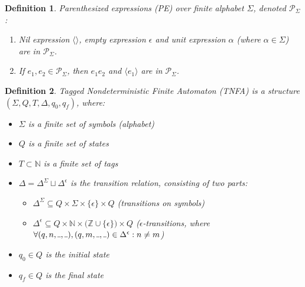 \documentclass[AMA,STIX1COL]{WileyNJD-v2}
\newcommand{\Xl}{\langle}
\newcommand{\Xr}{\rangle}
\newcommand{\Xm}{\langle\!\rangle}
\newcommand{\Xund}{\rule{.4em}{.4pt}}
\newcommand{\XP}{\mathcal{P}}
\newcommand{\YN}{\mathbb{N}}
\newcommand{\YZ}{\mathbb{Z}}
\newtheorem{Xdef}{Definition}
\begin{document}
    \begin{Xdef}
    \emph{Parenthesized expressions (PE)} over finite alphabet $\Sigma$, denoted $\XP_\Sigma$:
    \begin{enumerate}
        \item
            Nil expression $\Xm$,
            empty expression $\epsilon$ and
            unit expression $\alpha$ (where $\alpha \in \Sigma$)
            are in $\XP_\Sigma$.
        \item If $e_1, e_2 \in \XP_\Sigma$, then
            $e_1 e_2$ and
            $\Xl e_1 \Xr$
            are in $\XP_\Sigma$.
    \end{enumerate}
    \end{Xdef}


    \begin{Xdef}
    \emph{Tagged Nondeterministic Finite Automaton (TNFA)}
    is a structure $(\Sigma, Q, T, \Delta, q_0, q_f)$, where:
    \begin{itemize}
        \item[] $\Sigma$ is a finite set of symbols (\emph{alphabet})
        \item[] $Q$ is a finite set of \emph{states}
        \item[] $T\subset\YN$ is a finite set of \emph{tags}
        \item[] $\Delta = \Delta^\Sigma \sqcup \Delta^\epsilon$ is the \emph{transition} relation,
            consisting of two parts:
        \begin{itemize}
            \item[] $\Delta^\Sigma \subseteq Q \times \Sigma \times \{\epsilon\} \times Q$ (transitions on symbols)
            \item[] $\Delta^\epsilon \subseteq Q \times \YN \times \big( \YZ \cup \{\epsilon\} \big) \times Q$
                ($\epsilon$-transitions, where $\forall (q, n, \Xund, \Xund), (q, m, \Xund, \Xund) \in \Delta^\epsilon: n \neq m$)
        \end{itemize}
        \item[] $q_0 \in Q$ is the \emph{initial} state
        \item[] $q_f \in Q$ is the \emph{final} state
    \end{itemize}
    \end{Xdef}
\end{document}
